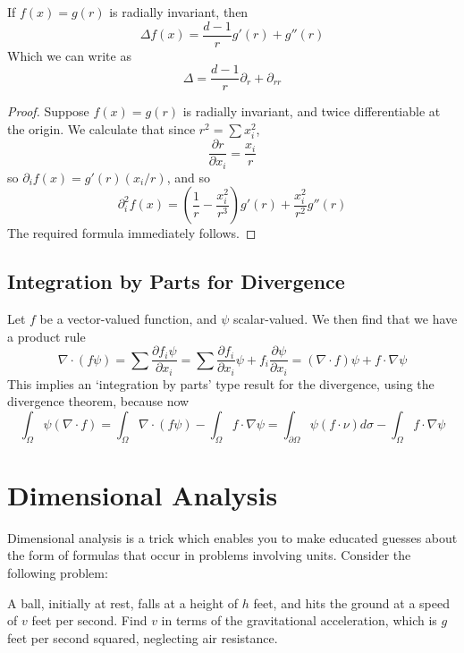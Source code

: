 \begin{theorem}
    If $f(x) = g(r)$ is radially invariant, then
    \[ \Delta f(x) = \frac{d - 1}{r} g'(r) + g''(r) \]
    Which we can write as
    \[ \Delta = \frac{d-1}{r} \partial_r + \partial_{rr} \]
\end{theorem}
\begin{proof}
Suppose $f(x) = g(r)$ is radially invariant, and twice differentiable at the origin. We calculate that since $r^2 = \sum x_i^2$,
%
\[ \frac{\partial r}{\partial x_i} = \frac{x_i}{r} \]
%
so $\partial_i f(x) = g'(r) (x_i/r)$, and so
%
\[ \partial_i^2 f(x) = \left( \frac{1}{r} - \frac{x_i^2}{r^3} \right) g'(r) + \frac{x_i^2}{r^2} g''(r) \]
%
The required formula immediately follows.
\end{proof}

\section{Integration by Parts for Divergence}

Let $f$ be a vector-valued function, and $\psi$ scalar-valued. We then find that we have a product rule
%
\[ \nabla \cdot (f \psi) = \sum \frac{\partial f_i \psi}{\partial x_i} = \sum \frac{\partial f_i}{\partial x_i} \psi + f_i \frac{\partial \psi}{\partial x_i} = (\nabla \cdot f) \psi + f \cdot \nabla \psi \]
%
This implies an `integration by parts' type result for the divergence, using the divergence theorem, because now
%
\[ \int_\Omega \psi (\nabla \cdot f) = \int_\Omega \nabla \cdot (f \psi) - \int_\Omega f \cdot \nabla 
\psi = \int_{\partial \Omega} \psi(f \cdot \nu) d\sigma - \int_\Omega f \cdot \nabla \psi \]








\chapter{Dimensional Analysis}

Dimensional analysis is a trick which enables you to make educated guesses about the form of formulas that occur in problems involving units. Consider the following problem:

\begin{displayquote}
    A ball, initially at rest, falls at a height of $h$ feet, and hits the ground at a speed of $v$ feet per second. Find $v$ in terms of the gravitational acceleration, which is $g$ feet per second squared, neglecting air resistance.
\end{displayquote}

